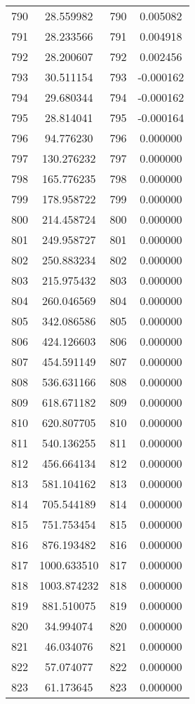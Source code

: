 \documentclass[12pt]{article}
\begin{document}
\begin{longtable}{@{}cccc@{}}
790 & 28.559982 & 790 & 0.005082 \\
791 & 28.233566 & 791 & 0.004918 \\
792 & 28.200607 & 792 & 0.002456 \\
793 & 30.511154 & 793 & -0.000162 \\
794 & 29.680344 & 794 & -0.000162 \\
795 & 28.814041 & 795 & -0.000164 \\
796 & 94.776230 & 796 & 0.000000 \\
797 & 130.276232 & 797 & 0.000000 \\
798 & 165.776235 & 798 & 0.000000 \\
799 & 178.958722 & 799 & 0.000000 \\
800 & 214.458724 & 800 & 0.000000 \\
801 & 249.958727 & 801 & 0.000000 \\
802 & 250.883234 & 802 & 0.000000 \\
803 & 215.975432 & 803 & 0.000000 \\
804 & 260.046569 & 804 & 0.000000 \\
805 & 342.086586 & 805 & 0.000000 \\
806 & 424.126603 & 806 & 0.000000 \\
807 & 454.591149 & 807 & 0.000000 \\
808 & 536.631166 & 808 & 0.000000 \\
809 & 618.671182 & 809 & 0.000000 \\
810 & 620.807705 & 810 & 0.000000 \\
811 & 540.136255 & 811 & 0.000000 \\
812 & 456.664134 & 812 & 0.000000 \\
813 & 581.104162 & 813 & 0.000000 \\
814 & 705.544189 & 814 & 0.000000 \\
815 & 751.753454 & 815 & 0.000000 \\
816 & 876.193482 & 816 & 0.000000 \\
817 & 1000.633510 & 817 & 0.000000 \\
818 & 1003.874232 & 818 & 0.000000 \\
819 & 881.510075 & 819 & 0.000000 \\
820 & 34.994074 & 820 & 0.000000 \\
821 & 46.034076 & 821 & 0.000000 \\
822 & 57.074077 & 822 & 0.000000 \\
823 & 61.173645 & 823 & 0.000000 \\

\end{longtable}
\end{document}
